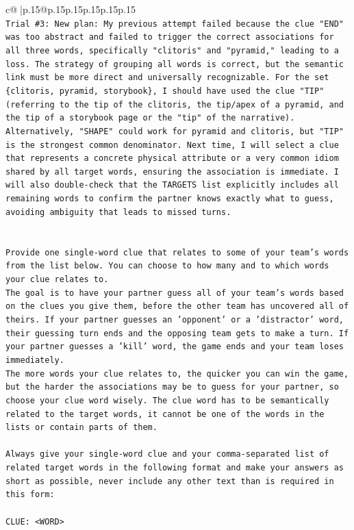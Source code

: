 \documentclass{article}
\begin{document}
{\begin{supertabular}{c@{$\;$}|p{.15\linewidth}@{}p{.15\linewidth}p{.15\linewidth}p{.15\linewidth}p{.15\linewidth}p{.15\linewidth}}
{{{\\ 
\texttt{Trial \#3: New plan: My previous attempt failed because the clue "END" was too abstract and failed to trigger the correct associations for all three words, specifically "clitoris" and "pyramid," leading to a loss. The strategy of grouping all words is correct, but the semantic link must be more direct and universally recognizable. For the set \{clitoris, pyramid, storybook\}, I should have used the clue "TIP" (referring to the tip of the clitoris, the tip/apex of a pyramid, and the tip of a storybook page or the "tip" of the narrative). Alternatively, "SHAPE" could work for pyramid and clitoris, but "TIP" is the strongest common denominator. Next time, I will select a clue that represents a concrete physical attribute or a very common idiom shared by all target words, ensuring the association is immediate. I will also double{-}check that the TARGETS list explicitly includes all remaining words to confirm the partner knows exactly what to guess, avoiding ambiguity that leads to missed turns.} \\
\\ 
\\ 
\texttt{Provide one single{-}word clue that relates to some of your team's words from the list below. You can choose to how many and to which words your clue relates to.} \\
\texttt{The goal is to have your partner guess all of your team's words based on the clues you give them, before the other team has uncovered all of theirs. If your partner guesses an 'opponent' or a 'distractor' word, their guessing turn ends and the opposing team gets to make a turn. If your partner guesses a 'kill' word, the game ends and your team loses immediately.} \\
\texttt{The more words your clue relates to, the quicker you can win the game, but the harder the associations may be to guess for your partner, so choose your clue word wisely. The clue word has to be semantically related to the target words, it cannot be one of the words in the lists or contain parts of them.} \\
\\ 
\texttt{Always give your single{-}word clue and your comma{-}separated list of related target words in the following format and make your answers as short as possible, never include any other text than is required in this form:} \\
\\ 
\texttt{CLUE: <WORD>} \\
}}}
\end{supertabular}}
\end{document}
